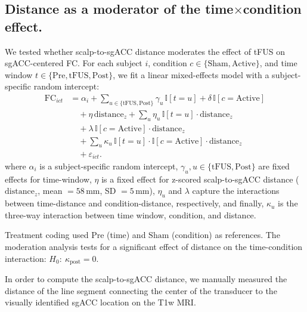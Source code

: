 \subsection*{Distance as a moderator of the time$\times$condition effect.}
\noindent
We tested whether scalp-to-sgACC distance moderates the effect of tFUS on sgACC-centered FC. For each subject $i$, condition $c\in\{\mathrm{Sham},\mathrm{Active}\}$, and time window $t\in\{\mathrm{Pre},\mathrm{tFUS},\mathrm{Post}\}$, we fit a linear mixed-effects model with a subject-specific random intercept:
\begin{equation}
\label{eq:distance_mixed}
\begin{aligned}
\mathrm{FC}_{ict} &=
\alpha_i 
+ \sum_{u\in\{\mathrm{tFUS},\mathrm{Post}\}}\gamma_u\,\mathbb{I}[t=u]
+ \delta\,\mathbb{I}[c=\mathrm{Active}]  \\
&\quad
+ \eta\,\mathrm{distance}_z 
+ \sum_{u}\eta_u\,\mathbb{I}[t=u]\cdot \mathrm{distance}_z \\
&\quad
+ \lambda\,\mathbb{I}[c=\mathrm{Active}]\cdot \mathrm{distance}_z\\
&\quad
+ \sum_{u}\kappa_u\,\mathbb{I}[t=u]\cdot \mathbb{I}[c=\mathrm{Active}]\cdot \mathrm{distance}_z \\
&\quad
+ \varepsilon_{ict}.
\end{aligned}
\end{equation}
where $\alpha_i$ is a subject-specific random intercept, $\gamma_u, u\in\{\mathrm{tFUS},\mathrm{Post}\}$ are fixed effects for time-window, $\eta$ is a fixed effect for z-scored scalp-to-sgACC distance ($\mathrm{distance}_z$, mean $=58$\,mm, SD $=5$\,mm), $\eta_u$ and $\lambda$ capture the interactions between time-distance and condition-distance, respectively, and finally, $\kappa_u$ is the three-way interaction between time window, condition, and distance. 

Treatment coding used $\mathrm{Pre}$ (time) and $\mathrm{Sham}$ (condition) as references. The moderation analysis tests for a significant effect of distance on the time-condition interaction: $H_0\!:\ \kappa_{\mathrm{post}}=0$. 

In order to compute the scalp-to-sgACC distance, we manually measured the distance of the line segment connecting the center of the transducer to the visually identified sgACC location on the T1w MRI.

